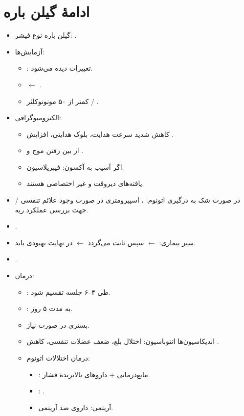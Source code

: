 \documentclass[a4paper,12pt]{extbook}
\begin{document}
\section*{ادامهٔ گیلن باره}
\begin{itemize}
\item گیلن باره نوع فیشر: .
\item آزمایش‌ها:
\begin{itemize}
\item {}:  تغییرات دیده می‌شود.
\item {} $\longleftarrow$ .
\item کمتر از ۵۰ مونونوکلئر / .
\end{itemize}
\item الکترومیوگرافی:
\begin{itemize}
\item کاهش شدید سرعت هدایت، بلوک هدایتی، افزایش .
\item از بین رفتن موج  و .
\item اگر آسیب به آکسون: فیبریلاسیون.
\item یافته‌های  دیروقت و غیر اختصاصی هستند.
\end{itemize}
\item در صورت شک به درگیری اتونوم: ، اسپیرومتری در صورت وجود علائم تنفسی /  جهت بررسی عملکرد ریه.
\item {}.
\item سیر بیماری:  $\longleftarrow$ سپس ثابت می‌گردد $\longleftarrow$ در نهایت بهبودی یابد.
\item {}.
\item درمان:
\begin{itemize}
\item {}:  طی ۴–۶ جلسه تقسیم شود.
\item {}:  به مدت ۵ روز.
\item بستری  در صورت نیاز.
\item اندیکاسیون‌ها انتوباسیون: اختلال بلع، ضعف عضلات تنفسی، کاهش .
\item درمان اختلالات اتونوم:
\begin{itemize}
\item {}: مایع‌درمانی + داروهای بالابرندهٔ فشار.
\item {}: .
\item آریتمی: داروی ضد آریتمی.
\end{itemize}
\end{itemize}
\end{itemize}
\end{document}
